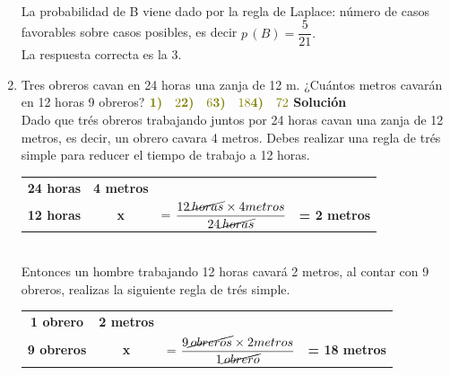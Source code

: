 \documentclass[11pt, a4paper]{article} %
\theoremstyle{dotlessP}
\theoremstyle{dotlessS}
\begin{document}
\begin{enumerate}[label=\color{dg}\theenumi.]
	\\
	La probabilidad de B viene dado por la regla de Laplace: 	número de casos favorables sobre casos posibles, es decir 		\textbf {\(p\,(B) = \dfrac{5}{21}.\)}\\
	{\color{dh} La respuesta correcta es la 3.}
	\item {\color{db} Tres obreros cavan en 24 horas una 		zanja de 12 m. ¿Cuántos metros cavarán en 12 horas 9 		obreros?
        }
        \(
\vspace{1\baselineskip} \\ 	
     {\color{dh} \textbf{1)} \quad 2} \vspace{1\baselineskip} \\ 	
     {\color{dh} \textbf{2)} \quad 6} \vspace{1\baselineskip} \\ 	
     {\color{dh} \textbf{3)} \quad 18} \vspace{1\baselineskip} \\ 	
     {\color{dh} \textbf{4)} \quad 72}   \vspace{1\baselineskip} \\ 	
      \)
        \textbf{Solución} 
	\\ Dado que trés obreros  trabajando juntos por 24 horas 	cavan una zanja de 12 metros, es decir, un obrero cavara 4 		metros.  Debes realizar una regla de trés simple para 		reducer el tiempo de trabajo a  12 horas.       
	\begin{table}[htbp]
	\centering
		\begin{tabular}{cccc}
		\textbf{24 horas} & \textbf{4 metros} &             &                  \\
		\textbf{12 horas} & \textbf{x}        & = 					$\displaystyle\frac{12 \cancel{\,horas} \times 4 			metros }{24 \cancel {\,horas}}$ & \textbf{= 2 metros}
		\end{tabular}
	\end{table}
 	\\ 
	Entonces un hombre trabajando 12 horas  cavará 2 metros, 	al contar con 9 obreros, realizas la siguiente regla de 	trés simple.
	\begin{table}[htbp]
	\centering
		\begin{tabular}{cccc}
		\textbf{1 obrero} & \textbf{2 metros} &             &                  \\
		\textbf{9 obreros} & \textbf{x}      &= 					$\displaystyle\frac{9 \cancel{\,obreros} \times 2 			metros }{1 \cancel {\,obrero}}$ & \textbf{= 18 				metros}

\end{tabular}
\end{table}
\end{enumerate}
\end{document}
